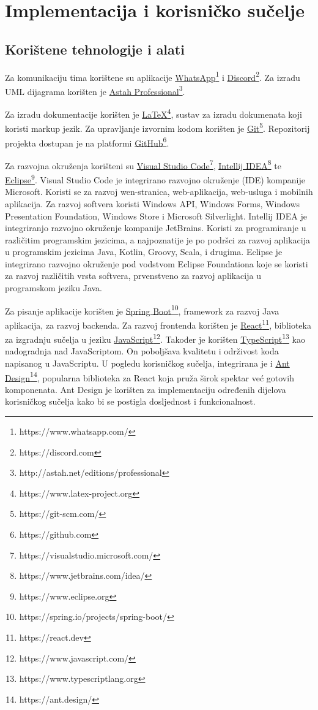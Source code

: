 \chapter{Implementacija i korisničko sučelje}


\section{Korištene tehnologije i alati}

\noindent Za komunikaciju tima korištene su aplikacije \underline{WhatsApp}\footnote{https://www.whatsapp.com/} i \underline{Discord}\footnote{https://discord.com}. Za izradu UML dijagrama korišten je \underline{Astah Professional}\footnote{http://astah.net/editions/professional}.

Za izradu dokumentacije korišten je \underline{LaTeX}\footnote{https://www.latex-project.org}, sustav za izradu dokumenata koji koristi markup jezik. Za upravljanje izvornim kodom korišten je \underline{Git}\footnote{https://git-scm.com/}. Repozitorij projekta dostupan je na platformi \underline{GitHub}\footnote{https://github.com}.

Za razvojna okruženja korišteni su \underline{Visual Studio Code}\footnote{https://visualstudio.microsoft.com/}, \underline{Intellij IDEA}\footnote{https://www.jetbrains.com/idea/} te \underline{Eclipse}\footnote{https://www.eclipse.org}. Visual Studio Code je integrirano razvojno okruženje (IDE) kompanije Microsoft. Koristi se za razvoj wen-stranica, web-aplikacija, web-usluga i mobilnih aplikacija. Za razvoj softvera koristi Windows API, Windows Forms, Windows Presentation Foundation, Windows Store i Microsoft Silverlight. Intellij IDEA je integriranjo razvojno okruženje kompanije JetBrains. Koristi za programiranje u različitim programskim jezicima, a najpoznatije je po podršci za razvoj aplikacija u programskim jezicima Java, Kotlin, Groovy, Scala, i drugima. Eclipse je integrirano razvojno okruženje pod vodstvom Eclipse Foundationa koje se koristi za razvoj različitih vrsta softvera, prvenstveno za razvoj aplikacija u programskom jeziku Java.

Za pisanje aplikacije korišten je \underline{Spring Boot}\footnote{https://spring.io/projects/spring-boot/}, framework za razvoj Java aplikacija, za razvoj backenda. Za razvoj frontenda korišten je \underline{React}\footnote{https://react.dev}, biblioteka za izgradnju sučelja u jeziku \underline{JavaScript}\footnote{https://www.javascript.com/}. Također je korišten \underline{TypeScript}\footnote{https://www.typescriptlang.org} kao nadogradnja nad JavaScriptom. On poboljšava kvalitetu i održivost koda napisanog u JavaScriptu. U pogledu korisničkog sučelja, integrirana je i \underline{Ant Design}\footnote{https://ant.design/}, popularna biblioteka za React koja pruža širok spektar već gotovih komponenata. Ant Design je korišten za implementaciju određenih dijelova korisničkog sučelja kako bi se postigla dosljednost i funkcionalnost.

